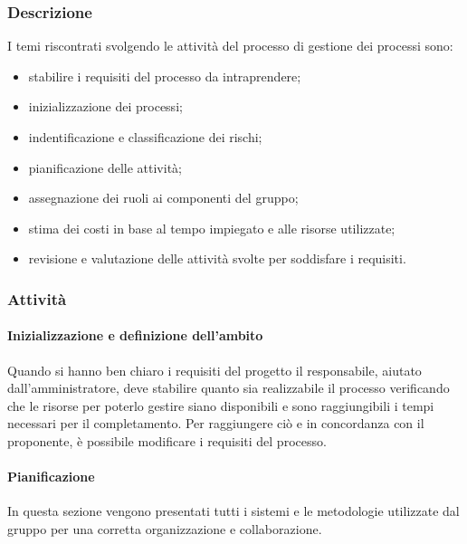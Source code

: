 \subsubsection{Descrizione}
I temi riscontrati svolgendo le attività del processo di gestione dei processi sono:
\begin{itemize}
	\item stabilire i requisiti del processo da intraprendere;
	\item inizializzazione dei processi;
	\item indentificazione e classificazione dei rischi;
	\item pianificazione delle attività; 
	\item assegnazione dei ruoli ai componenti del gruppo;
	\item stima dei costi in base al tempo impiegato e alle risorse utilizzate;
	\item revisione e valutazione delle attività svolte per soddisfare i requisiti.
\end{itemize}

\subsubsection{Attività}
\paragraph{Inizializzazione e definizione dell'ambito}
Quando si hanno ben chiaro i requisiti del progetto il responsabile, aiutato dall'amministratore, deve stabilire quanto sia realizzabile il processo verificando che le risorse per poterlo gestire siano disponibili e sono raggiungibili i tempi necessari per il completamento.
Per raggiungere ciò e in concordanza con il proponente, è possibile modificare i requisiti del processo.

\paragraph{Pianificazione}
In questa sezione vengono presentati tutti i sistemi e le metodologie utilizzate dal gruppo per una corretta organizzazione e collaborazione.


